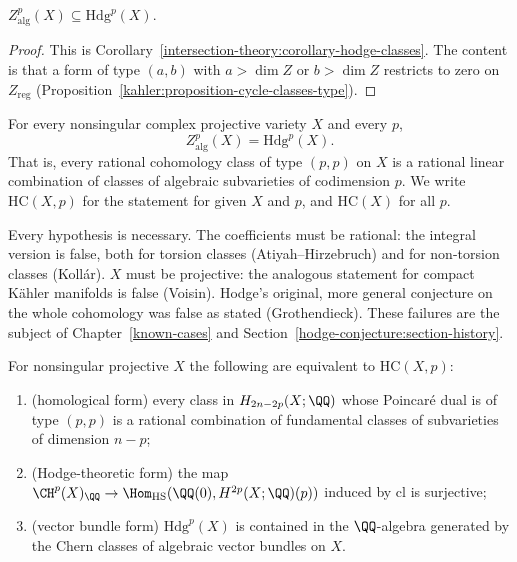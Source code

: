 \begin{proposition}\label{hodge-conjecture:proposition-easy-inclusion}
$Z^p_{\mathrm{alg}}(X) \subseteq \mathrm{Hdg}^p(X)$.
\end{proposition}

\begin{proof}
This is Corollary~\ref{intersection-theory:corollary-hodge-classes}. The content is that a form of type $(a, b)$ with $a > \dim Z$ or $b > \dim Z$ restricts to zero on $Z_{\mathrm{reg}}$
(Proposition~\ref{kahler:proposition-cycle-classes-type}).
\end{proof}

\begin{conjecture}\label{hodge-conjecture:conjecture-hodge}
For every nonsingular complex projective variety $X$ and every $p$,
\[
Z^p_{\mathrm{alg}}(X) = \mathrm{Hdg}^p(X).
\]
That is, every rational cohomology class of type $(p,p)$ on $X$ is a rational linear combination of classes of algebraic subvarieties of codimension $p$. We write $\mathrm{HC}(X, p)$
for the statement for given $X$ and $p$, and $\mathrm{HC}(X)$ for all $p$.
\end{conjecture}

\begin{remark}\label{hodge-conjecture:remark-load-bearing}
Every hypothesis is necessary. The coefficients must be rational: the integral version is false, both for torsion classes (Atiyah--Hirzebruch) and for non-torsion classes (Koll\'ar).
$X$ must be projective: the analogous statement for compact K\"ahler manifolds is false (Voisin). Hodge's original, more general conjecture on the whole cohomology was false as stated
(Grothendieck). These failures are the subject of Chapter~\ref{known-cases} and Section~\ref{hodge-conjecture:section-history}.
\end{remark}

\begin{proposition}\label{hodge-conjecture:proposition-equivalent-forms}
For nonsingular projective $X$ the following are equivalent to $\mathrm{HC}(X, p)$:
\begin{enumerate}
\item (homological form) every class in $H_{2n-2p}(X; \QQ)$ whose Poincar\'e dual is of type $(p,p)$ is a rational combination of fundamental classes of subvarieties of dimension $n - p$;
\item (Hodge-theoretic form) the map $\CH^p(X)_\QQ \to \Hom_{\mathrm{HS}}(\QQ(0), H^{2p}(X; \QQ)(p))$ induced by $\mathrm{cl}$ is surjective;
\item (vector bundle form) $\mathrm{Hdg}^p(X)$ is contained in the $\QQ$-algebra generated by the Chern classes of algebraic vector bundles on $X$.
\end{enumerate}
\end{proposition}


